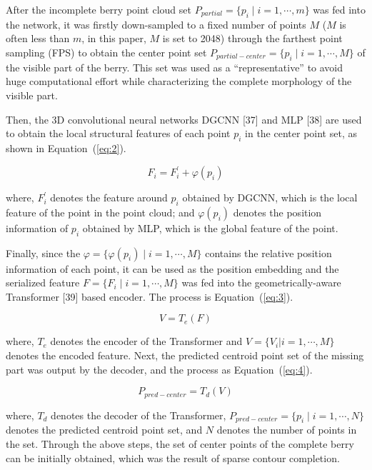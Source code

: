 \documentclass[12pt]{article}
\begin{document}
After the incomplete berry point cloud set $P_{partial}=\{p_i \mid i=1,\cdots,m\}$ was fed into the network, it was firstly down-sampled to a fixed number of points $M$ ($M$ is often less than $m$, in this paper, $M$ is set to 2048) through the farthest point sampling (FPS) to obtain the center point set $P_{partial-center}=\{p_i \mid i=1, \cdots, M\}$ of the visible part of the berry. 
This set was used as a ``representative'' to avoid huge computational effort while characterizing the complete morphology of the visible part.

Then, the 3D convolutional neural networks DGCNN [37] and MLP [38] are used to obtain the local structural features of each point $p_i$ in the center point set, as shown in Equation~(\ref{eq:2}).

\begin{equation}
    F_i = F_{i}^{'} + \varphi(p_i)
    \label{eq:2}
\end{equation}

{\raggedright where, $F_{i}^{'}$ denotes the feature around $p_i$ obtained by DGCNN, which is the local feature of the point in the point cloud; and $\varphi(p_i)$ denotes the position information of $p_i$ obtained by MLP, which is the global feature of the point.}

Finally, since the $\varphi = \{ \varphi(p_i) \mid i=1, \cdots, M \}$ contains the relative position information of each point, it can be used as the position embedding and the serialized feature $F = \{F_i \mid i=1, \cdots, M \}$ was fed into the geometrically-aware Transformer [39] based encoder. 
The process is Equation~(\ref{eq:3}).

\begin{equation}
    V = T_e(F)
    \label{eq:3}
\end{equation}

{\raggedright where, $T_e$ denotes the encoder of the Transformer and $V=\{V_i |i=1, \cdots, M\}$ denotes the encoded feature. 
Next, the predicted centroid point set of the missing part was output by the decoder, and the process as Equation~(\ref{eq:4}).}

\begin{equation}
    P_{pred-center} = T_d(V)
    \label{eq:4}
\end{equation}

{\raggedright where, $T_d$ denotes the decoder of the Transformer, $P_{pred-center}=\{p_i \mid i=1,\cdots,N\}$ denotes the predicted centroid point set, and $N$ denotes the number of points in the set. 
Through the above steps, the set of center points of the complete berry can be initially obtained, which was the result of sparse contour completion.}
\end{document}
